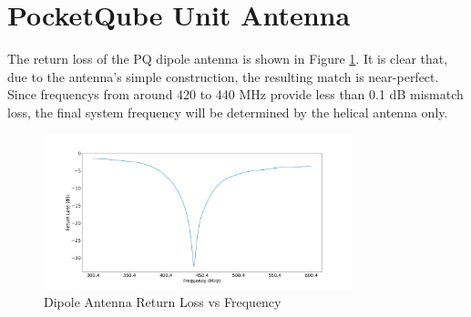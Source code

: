 \graphicspath{{./figures}}

\section{PocketQube Unit Antenna}

The return loss of the PQ dipole antenna is shown in Figure \ref{fig:dipoleReturnLoss}. It is clear that, due to the antenna's simple construction, the resulting match is near-perfect. Since frequencys from around 420 to 440 MHz provide less than 0.1 dB mismatch loss, the final system frequency will be determined by the helical antenna only.

\begin{figure}[!htb]
    \centering
    \includegraphics[width=0.8\textwidth]{dipoleReturnLoss}
    \caption{Dipole Antenna Return Loss vs Frequency}
    \label{fig:dipoleReturnLoss}
  \end{figure}